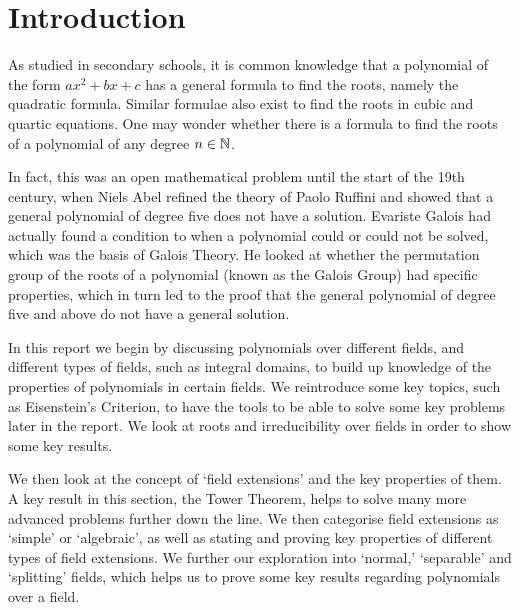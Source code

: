 
\section{Introduction}

As studied in secondary schools, it is common knowledge that a polynomial of the form $ax^2+bx+c$ has a general formula to find the roots, namely the quadratic formula. Similar formulae also exist to find the roots in cubic and quartic equations. One may wonder whether there is a formula to find the roots of a polynomial of any degree $n \in \mathbb N$.

In fact, this was an open mathematical problem until the start of the 19th century, when Niels Abel refined the theory of Paolo Ruffini and showed that a general polynomial of degree five does not have a solution. Evariste Galois had actually found a condition to when a polynomial could or could not be solved, which was the basis of Galois Theory. He looked at whether the permutation group of the roots of a polynomial (known as the Galois Group) had specific properties, which in turn led to the proof that the general polynomial of degree five and above do not have a general solution.

In this report we begin by discussing polynomials over different fields, and different types of fields, such as integral domains, to build up knowledge of the properties of polynomials in certain fields. We reintroduce some key topics, such as Eisenstein’s Criterion, to have the tools to be able to solve some key problems later in the report. We look at roots and irreducibility over fields in order to show some key results.

We then look at the concept of ‘field extensions’ and the key properties of them. A key result in this section, the Tower Theorem, helps to solve many more advanced problems further down the line. We then categorise field extensions as ‘simple’ or ‘algebraic’, as well as stating and proving key properties of different types of field extensions. We further our exploration into ‘normal,’ ‘separable’ and ‘splitting’ fields, which helps us to prove some key results regarding polynomials over a field.

